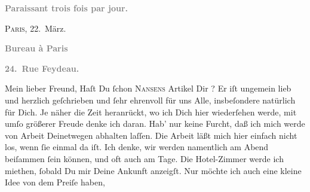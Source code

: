 \begin{ledgroupsized}[t]{13cm}
           \begin{otherlanguage}{french}\textcolor{gray}{\textbf{\textbf{Paraissant trois fois par jour.}}}\end{otherlanguage}\hfill \textsc{Paris}, 22. März.\pend
           \pstart
           \begin{otherlanguage}{french}\textcolor{gray}{\textbf{\textbf{Bureau à Paris}}}\end{otherlanguage}\pend
           \pstart
           \begin{otherlanguage}{french}\textcolor{gray}{\textbf{\textbf{24. Rue Feydeau.}}}\end{otherlanguage}\pend
           \pstart\center{}Mein lieber Freund,\pend\pstart
           Haſt Du ſchon \textsc{Nansens}{ }Artikel Dir \label{K_L02806-1v}\label{K_L02806-1h}? Er iſt ungemein lieb und herzlich geſchrieben und ſehr ehrenvoll für uns
               Alle, insbeſondere natürlich für Dich.\pend
           \pstart
           Je näher die Zeit heranrückt, wo ich Dich hier wiederſehen werde, mit umſo größerer
               Freude denke ich daran. Hab’ nur keine Furcht, daß ich mich werde von Arbeit
               Deinetwegen abhalten laſſen. Die Arbeit läßt mich hier einfach nicht los, wenn ſie
               einmal da iſt. Ich denke, wir werden namentlich am Abend beiſammen ſein können, und oft auch am Tage. {\pb} Die Hotel-Zimmer werde ich miethen, ſobald Du mir
               Deine Ankunft anzeigſt. Nur möchte ich auch eine kleine Idee von dem Preiſe haben,

\end{ledgroupsized}
